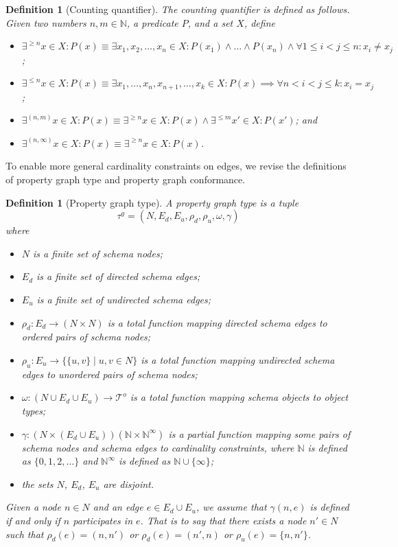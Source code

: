 \documentclass[a4paper]{article}
\makeatletter
\newtheorem{definition}[theorem]{Definition}
\newcommand{\N}{\mathbb{N}}
\newcommand{\pto}{}%
\DeclareRobustCommand{\pto}{\mathrel{\mathpalette\p@to@gets\to}}
\newcommand{\p@to@gets}[2]{%
  \ooalign{\hidewidth$\m@th#1\mapstochar\mkern5mu$\hidewidth\cr$\m@th#1\to$\cr}%
}
\newcommand{\otypes}{\mathcal{T}^o}
\newcommand{\gtype}{\tau^g}
\makeatother
\begin{document}
\begin{definition}[Counting quantifier]
  The \emph{counting quantifier} is defined as follows. Given two numbers $n, m \in \N$, a predicate $P$, and a set $X$, define
  \begin{itemize}
    \item $\exists^{\geq n} x \in X : P(x) \equiv \exists x_1, x_2, \ldots, x_n \in X : P(x_1) \wedge \ldots \wedge P(x_n) \wedge \forall 1 \leq i < j \leq n : x_i \neq x_j$;
    \item $\exists^{\leq n} x \in X : P(x) \equiv \exists x_1, \ldots, x_n, x_{n+1}, \ldots, x_k \in X : P(x) \implies \forall n < i < j \leq k : x_i = x_j$;
    \item $\exists^{(n, m)} x \in X : P(x) \equiv \exists^{\geq n} x \in X : P(x) \wedge \exists^{\leq m} x' \in X : P(x')$; and
    \item $\exists^{(n, \infty)} x \in X : P(x) \equiv \exists^{\geq n} x \in X : P(x)$.
  \end{itemize}
\end{definition}

To enable more general cardinality constraints on edges, we revise the definitions of property graph type and property graph conformance.

\begin{definition}[Property graph type]
  A \emph{property graph type} is a tuple \[\gtype = (N, E_d, E_u, \rho_d, \rho_u, \omega, \gamma)\] where
  \begin{itemize}
    \item $N$ is a finite set of schema nodes;
    \item $E_d$ is a finite set of directed schema edges;
    \item $E_u$ is a finite set of undirected schema edges;
    \item $\rho_d : E_d \to (N \times N)$ is a total function mapping directed schema edges to ordered pairs of schema nodes;
    \item $\rho_u : E_u \to \{\{u, v\} \mid u, v \in N\}$ is a total function mapping undirected schema edges to unordered pairs of schema nodes;
    \item $\omega : (N \cup E_d \cup E_u) \to \otypes$ is a total function mapping schema objects to object types;
    \item $\gamma : (N \times (E_d \cup E_u)) \pto (\N \times \N^\infty)$ is a partial function mapping some pairs of schema nodes and schema edges to cardinality constraints, where $\N$ is defined as $\{0, 1, 2, \ldots\}$ and $\N^\infty$ is defined as $\N \cup \{\infty\}$;
    \item the sets $N$, $E_d$, $E_u$ are disjoint.
  \end{itemize}


  Given a node $n \in N$ and an edge $e \in E_d \cup E_u$, we assume that $\gamma(n, e)$ is defined if and only if $n$ \emph{participates} in $e$. That is to say that there exists a node $n' \in N$ such that $\rho_d(e) = (n, n')$ or $\rho_d(e) = (n', n)$ or $\rho_u(e) = \{n, n'\}$.
\end{definition}
\end{document}
